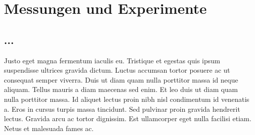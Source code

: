 %
%

\chapter{Messungen und Experimente}
\label{cha:experiments}

\section{...}
Justo eget magna fermentum iaculis eu. Tristique et egestas quis ipsum suspendisse ultrices gravida dictum. Luctus accumsan tortor posuere ac ut consequat semper viverra. Duis ut diam quam nulla porttitor massa id neque aliquam. Tellus mauris a diam maecenas sed enim. Et leo duis ut diam quam nulla porttitor massa. Id aliquet lectus proin nibh nisl condimentum id venenatis a. Eros in cursus turpis massa tincidunt. Sed pulvinar proin gravida hendrerit lectus. Gravida arcu ac tortor dignissim. Est ullamcorper eget nulla facilisi etiam. Netus et malesuada fames ac.
